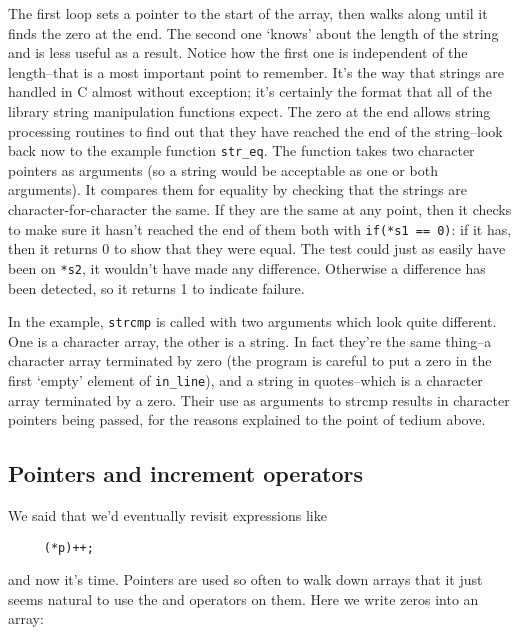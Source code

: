    The first loop sets a pointer to the start of the array, then walks
    along until it finds the zero at the end. The second one `knows'
    about the length of the string and is less useful as a result. Notice
    how the first one is independent of the length--that is a most
    important point to remember. It's the way that strings are handled in
    C almost without exception; it's certainly the format that all of the
    library string manipulation functions expect. The zero at the end allows
    string processing routines to find out that they have reached the end of
    the string--look back now to the example function
    \texttt{str\_eq}.  The function takes two character pointers as
    arguments (so a string would be acceptable as one or both arguments). It
    compares them for equality by checking that the strings are
    character-for-character the same. If they are the same at any point,
    then it checks to make sure it hasn't reached the end of them both with
    \texttt{if(*s1 == 0)}: if it has, then it returns 0 to show that
    they were equal. The test could just as easily have been on
    \texttt{*s2}, it wouldn't have made any difference.  Otherwise
    a difference has been detected, so it returns 1 to indicate failure.


   In the example, \texttt{strcmp} is called with two arguments which
    look quite different. One is a character array, the other is a string.
    In fact they're the same thing--a character array terminated by zero
    (the program is careful to put a zero in the first `empty' element
    of \texttt{in\_line}), and a string in quotes--which is
    a character array terminated by a zero. Their use as arguments to strcmp
    results in character pointers being passed, for the reasons explained to
    the point of tedium above.


  

  \subsection{Pointers and increment operators}
   

   We said that we'd eventually revisit expressions like


   \begin{Verbatim}
     (*p)++;
   \end{Verbatim}

   and now it's time. Pointers are used so often to walk down arrays that
    it just seems natural to use the \pp{} and \mm{}
    operators on them. Here we write zeros into an array:


